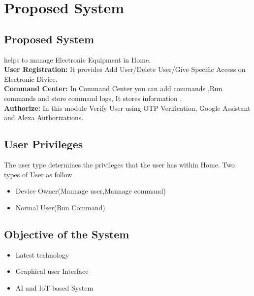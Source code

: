 \chapter{Proposed System}


\section{Proposed System}
helps to manage Electronic Equipment in Home.\\

\textbf{User Registration:} It provides Add User/Delete User/Give Specific Access on Electronic Divice.\\
 
\textbf{Command Center:} In Command Center you can add commands ,Run commands and store command logs, It stores information .\\

\textbf{Authorize:} In this module Verify User using OTP Verification, Google Assistant and Alexa Authorizations.\\


\section{User Privileges}
The user type determines the privileges that the user has within Home. Two types of User as follow\\
\begin{itemize}
\item Device Owner(Mannage user,Mannage command)
\item Normal User(Run Command)
\end{itemize}


\section{Objective of the System}

\begin{itemize}
\item Latest technology 
\item Graphical user Interface
\item AI and IoT based System
\end{itemize}